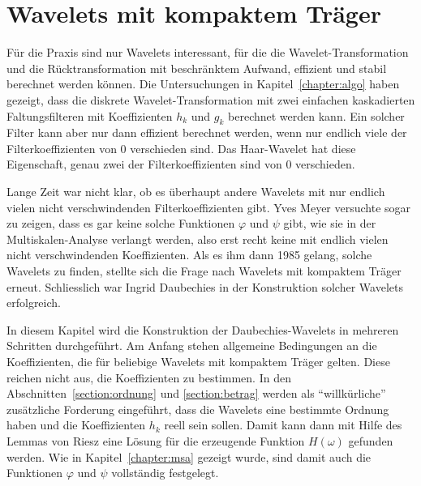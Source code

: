%
%
%
\chapter{Wavelets mit kompaktem Träger
\label{chapter:kompakt}}
\rhead{}
Für die Praxis sind nur Wavelets interessant, für die die
Wavelet-Transformation und die Rücktransformation mit beschränktem Aufwand,
effizient und stabil berechnet werden können.
Die Untersuchungen in Kapitel~\ref{chapter:algo} haben gezeigt, dass 
die diskrete Wavelet-Transformation mit zwei einfachen kaskadierten
Faltungsfilteren mit Koeffizienten $h_k$ und $g_k$ berechnet werden kann.
Ein solcher Filter kann aber nur dann effizient berechnet werden,
wenn nur endlich viele der Filterkoeffizienten von 0 verschieden sind.
Das Haar-Wavelet hat diese Eigenschaft, genau zwei der Filterkoeffizienten
sind von 0 verschieden.

Lange Zeit war nicht klar, ob es überhaupt andere Wavelets mit
nur endlich vielen nicht verschwindenden Filterkoeffizienten gibt.
Yves Meyer versuchte sogar zu zeigen, dass es gar keine solche Funktionen
%
$\varphi$ und $\psi$ gibt, wie sie in der Multiskalen-Analyse verlangt
werden, also erst recht keine mit endlich vielen nicht verschwindenden
Koeffizienten.
Als es ihm dann 1985 gelang, solche Wavelets zu finden, stellte sich
die Frage nach Wavelets mit kompaktem Träger erneut.
Schliesslich war Ingrid Daubechies in der Konstruktion solcher Wavelets
erfolgreich.

In diesem Kapitel wird die Konstruktion der Daubechies-Wavelets
in mehreren Schritten durchgeführt.
Am Anfang stehen allgemeine Bedingungen an die Koeffizienten,
die für beliebige Wavelets mit kompaktem Träger gelten.
Diese reichen nicht aus, die Koeffizienten zu bestimmen.
In den Abschnitten~\ref{section:ordnung} und \ref{section:betrag} werden
als ``willkürliche'' zusätzliche Forderung eingeführt, dass  die
Wavelets eine bestimmte Ordnung haben und die Koeffizienten $h_k$ reell
sein sollen.
Damit kann dann mit Hilfe des Lemmas von Riesz eine Lösung für die
erzeugende Funktion $H(\omega)$ gefunden werden.
Wie in Kapitel~\ref{chapter:msa} gezeigt wurde, sind damit auch
die Funktionen $\varphi$ und $\psi$ vollständig festgelegt.











